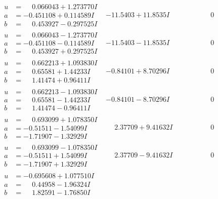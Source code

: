 \documentclass[1p]{elsarticle_modified}
\theoremstyle{definition}
\begin{document}
$$\begin{array}{c|c|c}
\begin{aligned}
u &= \phantom{-}0.066043 + 1.273770 I \\
a &= -0.451108 + 0.114589 I \\
b &= \phantom{-}0.453927 - 0.297525 I\end{aligned}
 & -11.5403 + 11.8535 I & \phantom{-0.000000 } 0 \\ \hline\begin{aligned}
u &= \phantom{-}0.066043 - 1.273770 I \\
a &= -0.451108 - 0.114589 I \\
b &= \phantom{-}0.453927 + 0.297525 I\end{aligned}
 & -11.5403 - 11.8535 I & \phantom{-0.000000 } 0 \\ \hline\begin{aligned}
u &= \phantom{-}0.662213 + 1.093830 I \\
a &= \phantom{-}0.65581 + 1.44233 I \\
b &= \phantom{-}1.41474 + 0.96411 I\end{aligned}
 & -0.84101 + 8.70296 I & \phantom{-0.000000 } 0 \\ \hline\begin{aligned}
u &= \phantom{-}0.662213 - 1.093830 I \\
a &= \phantom{-}0.65581 - 1.44233 I \\
b &= \phantom{-}1.41474 - 0.96411 I\end{aligned}
 & -0.84101 - 8.70296 I & \phantom{-0.000000 } 0 \\ \hline\begin{aligned}
u &= \phantom{-}0.693099 + 1.078350 I \\
a &= -0.51511 - 1.54099 I \\
b &= -1.71907 - 1.32929 I\end{aligned}
 & \phantom{-}2.37709 + 9.41632 I & \phantom{-0.000000 } 0 \\ \hline\begin{aligned}
u &= \phantom{-}0.693099 - 1.078350 I \\
a &= -0.51511 + 1.54099 I \\
b &= -1.71907 + 1.32929 I\end{aligned}
 & \phantom{-}2.37709 - 9.41632 I & \phantom{-0.000000 } 0 \\ \hline\begin{aligned}
u &= -0.695608 + 1.077510 I \\
a &= \phantom{-}0.44958 - 1.96324 I \\
b &= \phantom{-}1.82591 - 1.76850 I\end{aligned}

\end{array}$$
\end{document}
